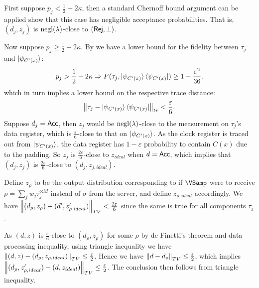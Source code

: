 \begin{prf}
	First suppose $p_j<\frac{1}{2}-2\kappa$,
	then a standard Chernoff bound argument can be applied show that this case has negligible acceptance probabilities.
	That is, $(d_j, z_j)$ is $\operatorname{negl}(\lambda)$-close to $(\mathsf{Rej}, \bot)$.

	Now suppose $p_j\geq\frac{1}{2}-2\kappa$.
	By  we have a lower bound for the fidelity between $\tau_j$ and $\ket{\psi_{C'(x)}}$:
	$$p_j>\frac{1}{2}-2\kappa\Rightarrow F(\tau_j, \ket{\psi_{C'(x)}}\bra{\psi_{C'(x)}})\geq1-\frac{\varepsilon^2}{36}.$$
	which in turn implies a lower bound on the respective trace distance:
	$$\left\lVert\tau_j - \ket{\psi_{C'(x)}}\bra{\psi_{C'(x)}}\right\rVert_{tr}<\frac{\varepsilon}{6}.$$
	Suppose $d_j=\mathsf{Acc}$, then $z_j$ would be $\operatorname{negl}(\lambda)$-close to the measurement on $\tau_j$'s data register,
	which is $\frac{\varepsilon}{6}$-close to that on $\ket{\psi_{C'(x)}}$.
	As the clock register is traced out from $\ket{\psi_{C'(x)}}$, the data register has $1-\varepsilon$ probability to contain $C(x)$ due to the padding.
	So $z_j$ is $\frac{2\varepsilon}{6}$-close to $z_{ideal}$ when $d=\mathsf{Acc}$,
	which implies that $(d_j, z_j)$ is $\frac{2\varepsilon}{6}$-close to $(d_j, z_{j, ideal})$.

	Define $z_\rho$ to be the output distribution corresponding to if $\VSamp$ were to receive $\rho=\sum_j w_j\tau_j^{\otimes M}$ instead of $\sigma$ from the server,
	and define $z_{\rho, ideal}$ accordingly.
	We have $\left\lVert(d_\rho, z_\rho) - (d', z'_{\rho, ideal})\right\rVert_{TV} < \frac{2\varepsilon}{6}$ since the same is true for all components $\tau_j$.

	As $(d, z)$ is $\frac{\varepsilon}{6}$-close to $(d_\rho, z_\rho)$ for some $\rho$ by de Finetti's theorem and data processing inequality,
	using triangle inequality we have $\left\lVert(d, z) - (d_\rho, z_{\rho, ideal})\right\rVert_{TV}\leq\frac{\varepsilon}{2}$.
	Hence we have $\left\lVert d - d_\rho\right\rVert_{TV}\leq\frac{\varepsilon}{2}$, which implies $\left\lVert(d_\rho, z'_{\rho, ideal}) - (d, z_{ideal})\right\rVert_{TV}\leq\frac{\varepsilon}{2}$.
	The conclusion then follows from triangle inequality.
\end{prf}
